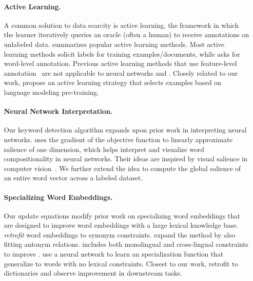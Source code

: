 \paragraph{Active Learning.}
A common solution to data scarcity is active learning, the framework in which
the learner iteratively queries an oracle (often a human) to receive
annotations on unlabeled data.
\citet{settles-09} summarizes popular active learning methods.
Most active learning methods solicit labels for training examples/documents,
while \name{} asks for word-level annotation.
Previous active learning methods that use feature-level
annotation~\citep{raghavan-06,zaidan-07,druck-09,settles-11-fixed} are not applicable to
neural networks and .
Closely related to our work, \citet{yuan-2020-alps} propose an active learning strategy that selects examples based on language modeling pre-training.

\paragraph{Neural Network Interpretation.}
Our keyword detection algorithm expands upon prior
work in interpreting neural networks.
\citet{li-16} uses the gradient of the objective function to linearly
approximate salience of one dimension, which helps interpret and visualize
word compositionality in neural networks.
Their ideas are inspired by visual salience in computer vision~\citep{simonyan-2013,zeiler-14}.
We further extend the idea to compute the global salience of an entire word vector
across a labeled dataset.

\paragraph{Specializing Word Embeddings.}
Our update equations modify prior work on specializing word
embeddings that are designed to improve word embeddings with a large
lexical knowledge base.
\citet{faruqui-15} \emph{retrofit} word embeddings to synonym constraints.
\citet{mrksic-16} expand the method by also fitting antonym relations.
\citet{mrksic-17} includes both monolingual and cross-lingual constraints to
improve .
\citet{glavas-18} use a neural network to learn an specialization
function that generalize to words with no lexical constraints.
Closest to our work, \citet{zhang-20b} retrofit  to dictionaries and observe improvement in downstream tasks.
